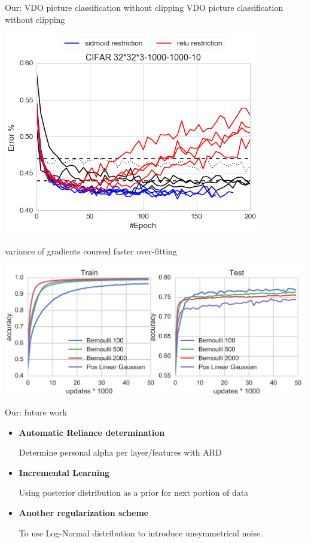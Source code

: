 \documentclass{beamer}
\begin{document}
\begin{frame}{Our: VDO picture classification without clipping}
	VDO picture classification without clipping
	\begin{center}
		\includegraphics[scale=0.35]{./img/restr.png}
	\end{center}
	\vspace{-0.5cm}
	variance of gradients coursed faster over-fitting
		\begin{center}
			\includegraphics[scale=0.35]{./img/ove.png}
		\end{center}
\end{frame}

\begin{frame}{Our: future work}
	\begin{itemize}
		\item \textbf{Automatic Reliance determination}
			\begin{center}
				Determine personal alpha per layer/features with ARD
			\end{center}		
		\item \textbf{Incremental Learning}
		\begin{center}
			Using posterior distribution as a prior for next portion of data
		\end{center}		
		\item \textbf{Another regularization scheme}
		\begin{center}
			To use Log-Normal distribution to introduce unsymmetrical noise. 
		\end{center}	
	\end{itemize}
\end{frame}
\end{document}
